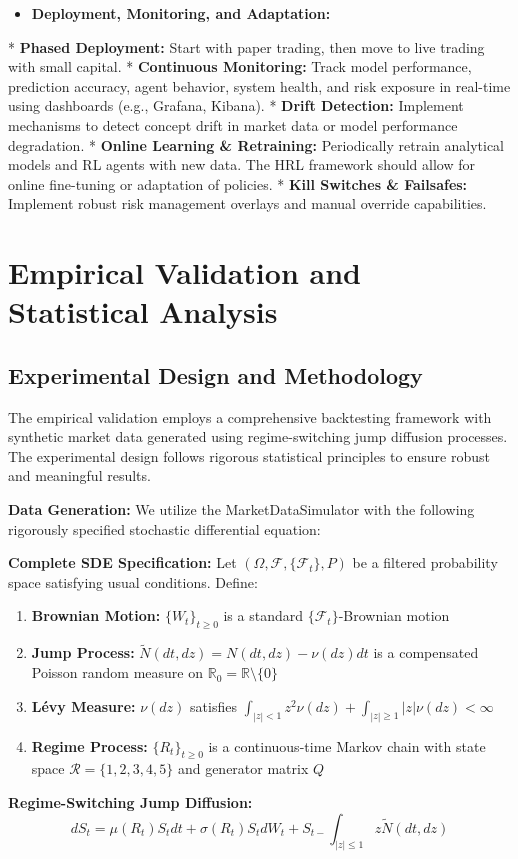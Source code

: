\documentclass[11pt,a4paper]{article}
\begin{document}
\begin{itemize}
\item   \textbf{Deployment, Monitoring, and Adaptation:}
\end{itemize}
    *   \textbf{Phased Deployment:} Start with paper trading, then move to live trading with small capital.
    *   \textbf{Continuous Monitoring:} Track model performance, prediction accuracy, agent behavior, system health, and risk exposure in real-time using dashboards (e.g., Grafana, Kibana).
    *   \textbf{Drift Detection:} Implement mechanisms to detect concept drift in market data or model performance degradation.
    *   \textbf{Online Learning \& Retraining:} Periodically retrain analytical models and RL agents with new data. The HRL framework should allow for online fine-tuning or adaptation of policies.
    *   \textbf{Kill Switches \& Failsafes:} Implement robust risk management overlays and manual override capabilities.

\section{Empirical Validation and Statistical Analysis}

\subsection{Experimental Design and Methodology}

The empirical validation employs a comprehensive backtesting framework with synthetic market data generated using regime-switching jump diffusion processes. The experimental design follows rigorous statistical principles to ensure robust and meaningful results.

\textbf{Data Generation:} We utilize the MarketDataSimulator with the following rigorously specified stochastic differential equation:

\textbf{Complete SDE Specification:}
Let $(\Omega, \mathcal{F}, \{\mathcal{F}_t\}, P)$ be a filtered probability space satisfying usual conditions. Define:

\begin{enumerate}
\item \textbf{Brownian Motion:} $\{W_t\}_{t \geq 0}$ is a standard $\{\mathcal{F}_t\}$-Brownian motion
\item \textbf{Jump Process:} $\tilde{N}(dt, dz) = N(dt, dz) - \nu(dz)dt$ is a compensated Poisson random measure on $\mathbb{R}_0 = \mathbb{R} \setminus \{0\}$
\item \textbf{Lévy Measure:} $\nu(dz)$ satisfies $\int_{|z|<1} z^2 \nu(dz) + \int_{|z| \geq 1} |z| \nu(dz) < \infty$
\item \textbf{Regime Process:} $\{R_t\}_{t \geq 0}$ is a continuous-time Markov chain with state space $\mathcal{R} = \{1,2,3,4,5\}$ and generator matrix $Q$

\end{enumerate}
\textbf{Regime-Switching Jump Diffusion:}
\begin{equation}
dS_t = \mu(R_t) S_t dt + \sigma(R_t) S_t dW_t + S_{t-} \int_{|z| \leq 1} z \tilde{N}(dt, dz)
\end{equation}
\end{document}
